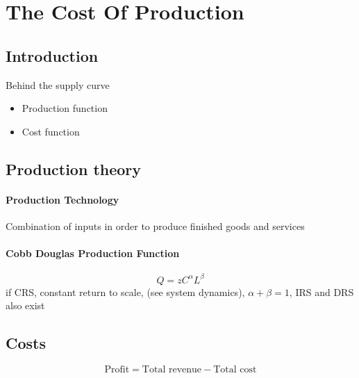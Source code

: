 \documentclass[a4paper,titlepage] {scrartcl}
\begin{document}

\section{The Cost Of Production}

\subsection{Introduction} %
\label{sub:introduction}
Behind the supply curve
\begin{itemize}
	\item Production function
	\item Cost function
\end{itemize}

\subsection{Production theory} %
\label{sub:production_theory}
\paragraph{Production Technology} %
\label{par:production_technology}
Combination of inputs in order to produce finished goods and services

\paragraph{Cobb Douglas Production Function} %
\label{par:cobb_douglas_production_function}
\begin{equation}
	Q = zC^{\alpha}L^{\beta}
\end{equation}
if CRS, constant return to scale, (see system dynamics), $\alpha+\beta=1$, IRS and DRS also exist


\subsection{Costs} %
\label{par:costs}

\begin{equation}
	\text{Profit} = \text{Total revenue} - \text{Total cost}
\end{equation}
\end{document}
